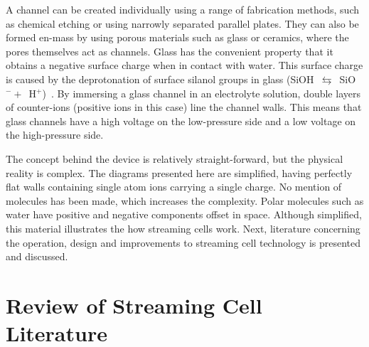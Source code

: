   A channel can be created individually using a range of fabrication methods, such as chemical etching or using narrowly separated parallel plates.
  They can also be formed en-mass by using porous materials such as glass or ceramics, where the pores themselves act as channels.
  Glass has the convenient property that it obtains a negative surface charge when in contact with water.
  This surface charge is caused by the deprotonation of surface silanol groups in glass (SiOH~$\leftrightarrows$~SiO$^{-}+$~H$^{+}$)~\cite{Kirby2004}.
  By immersing a glass channel in an electrolyte solution, double layers of counter-ions (positive ions in this case) line the channel walls.
  This means that glass channels have a high voltage on the low-pressure side and a low voltage on the high-pressure side.

  The concept behind the device is relatively straight-forward, but the physical reality is complex.
  The diagrams presented here are simplified, having perfectly flat walls containing single atom ions carrying a single charge.
  No mention of molecules has been made, which increases the complexity.
  Polar molecules such as water have positive and negative components offset in space.
  Although simplified, this material illustrates the how streaming cells work.
  Next, literature concerning the operation, design and improvements to streaming cell technology is presented and discussed.


\section{Review of Streaming Cell Literature}

